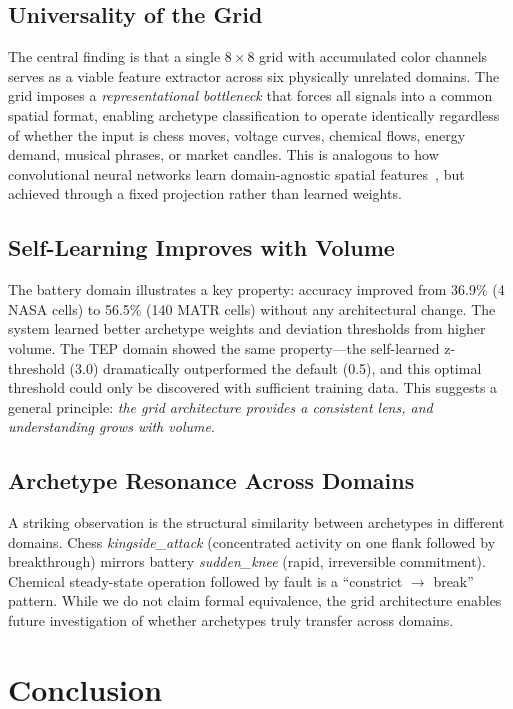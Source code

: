 \documentclass[11pt,a4paper]{article}
\begin{document}
\subsection{Universality of the Grid}
The central finding is that a single $8\times8$ grid with accumulated color channels serves
as a viable feature extractor across six physically unrelated domains. The grid
imposes a \emph{representational bottleneck} that forces all signals into a common
spatial format, enabling archetype classification to operate identically regardless
of whether the input is chess moves, voltage curves, chemical flows, energy demand,
musical phrases, or market candles. This is analogous to how convolutional neural
networks learn domain-agnostic spatial features~\citep{dosovitskiy2021}, but achieved
through a fixed projection rather than learned weights.

\subsection{Self-Learning Improves with Volume}
The battery domain illustrates a key property: accuracy improved from 36.9\% (4 NASA
cells) to 56.5\% (140 MATR cells) without any architectural change. The system
learned better archetype weights and deviation thresholds from higher volume. The
TEP domain showed the same property---the self-learned z-threshold (3.0) dramatically
outperformed the default (0.5), and this optimal threshold could only be discovered
with sufficient training data. This suggests a general principle: \emph{the grid
architecture provides a consistent lens, and understanding grows with volume}.

\subsection{Archetype Resonance Across Domains}
A striking observation is the structural similarity between archetypes in different
domains. Chess \emph{kingside\_attack} (concentrated activity on one flank followed by
breakthrough) mirrors battery \emph{sudden\_knee} (rapid, irreversible commitment).
Chemical steady-state operation followed by fault is a ``constrict $\to$ break'' pattern.
While we do not claim formal equivalence, the grid architecture enables future
investigation of whether archetypes truly transfer across domains.

\section{Conclusion}
\end{document}
